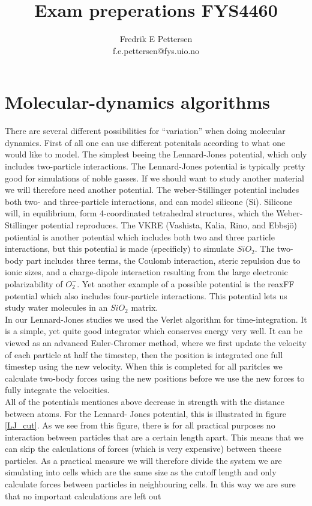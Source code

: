 \documentclass[a4paper,english, 10pt, twoside]{article}
\title{Exam preperations FYS4460}
\author{Fredrik E Pettersen\\ f.e.pettersen@fys.uio.no}
\begin{document}
\maketitle
\newpage
\tableofcontents
\newpage

\section{Molecular-dynamics algorithms}
There are several different possibilities for ``variation'' when doing molecular dynamics. First of all 
one can use different potenitals according to what one would like to model. The simplest beeing the 
Lennard-Jones potential, which only includes two-particle interactions. The Lennard-Jones potential is 
typically pretty good for simulations of noble gasses. If we should want to study another material we will 
therefore need another potential. The weber-Stillinger potential includes both two- and three-particle 
interactions, and can model silicone (Si). Silicone will, in equilibrium, form 4-coordinated tetrahedral 
structures, which the Weber-Stillinger potential reproduces. The VKRE (Vashista, Kalia, Rino, and Ebbsjö) 
potiential is another potential which includes both two and three particle interactions, but this potential 
is made (specificly) to simulate $SiO_2$. The two-body part includes three terms, the Coulomb interaction, 
steric repulsion due to ionic sizes, and a charge-dipole interaction resulting from the large
electronic polarizability of $O_2^-$. Yet another example of a possible potential is the reaxFF potential 
which also includes four-particle interactions. This potential lets us study water molecules in an $SiO_2$ 
matrix.\\
In our Lennard-Jones studies we used the Verlet algorithm for time-integration. It is a simple, yet quite 
good integrator which conserves energy very well. It can be viewed as an advanced Euler-Chromer method, 
where we first update the velocity of each particle at half the timestep, then the position is integrated 
one full timestep using the new velocity. When this is completed for all paritcles we calculate two-body 
forces using the new positions before we use the new forces to fully integrate the velocities.\\
All of the potentials mentiones above decrease in strength with the distance between atoms. For the Lennard-
Jones potential, this is illustrated in figure \ref{LJ_cut}. As we see from this figure, there is for all 
practical purposes no interaction between particles that are a certain length apart. This means that we 
can skip the calculations of forces (which is very expensive) between theese particles. As a practical 
measure we will therefore divide the system we are simulating into cells which are the same size as the 
cutoff length and only calculate forces between particles in neighbouring cells. In this way we are sure 
that no important calculations are left out
\end{document}
